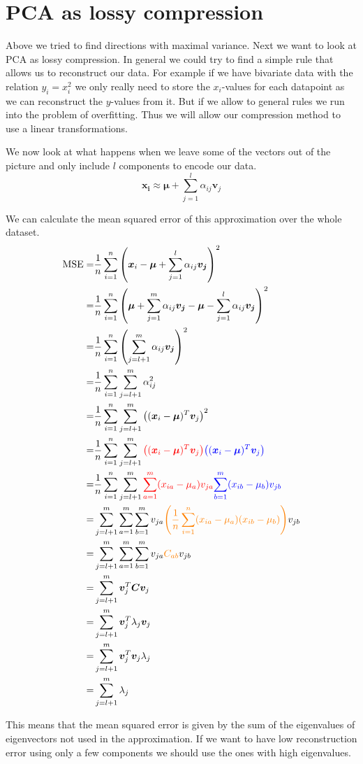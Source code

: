 \section{PCA as lossy compression}
Above we tried to find directions with maximal variance.
Next we want to look at PCA as lossy compression.
In general we could try to find a simple rule that allows us to reconstruct our data.
For example if we have bivariate data with the relation $y_i = x_i^2$ we only really need to store the $x_i$-values
for each datapoint as we can reconstruct the $y$-values from it.
But if we allow to general rules we run into the problem of overfitting.
Thus we will allow our compression method to use a linear transformations.

We now look at what happens when we 
leave some of the vectors out of the picture and only include $l$ components to encode our data.
\begin{equation}
    \bm{x_i} \approx \bm{\mu} + \sum_{j=1}^l \alpha_{ij} \bm{v}_j
\end{equation}

We can calculate the mean squared error of this approximation over the whole dataset.
\begin{align}
    \text{MSE} =& \frac{1}{n} \sum_{i=1}^n \left(\bm{x}_i - \bm{\mu} + \sum_{j=1}^l \alpha_{ij} \bm{v_j}\right)^2 \\
    =& \frac{1}{n} \sum_{i=1}^n \left(\bm{\mu} + \sum_{j=1}^m \alpha_{ij} \bm{v_j} - \bm{\mu} - \sum_{j=1}^l \alpha_{ij} \bm{v_j}\right)^2 \\
    =& \frac{1}{n} \sum_{i=1}^n \left(\sum_{j=l+1}^m \alpha_{ij} \bm{v_j} \right)^2 \\
    =& \frac{1}{n} \sum_{i=1}^n \sum_{j=l+1}^m \alpha_{ij} ^2 \\
    =& \frac{1}{n} \sum_{i=1}^n \sum_{j=l+1}^{m} \left( (\bm{x}_i - \bm{\mu})^T \bm{v}_j \right)^2 \\
    =& \frac{1}{n} \sum_{i=1}^n \sum_{j=l+1}^{m} {\color{red} \left( (\bm{x}_i - \bm{\mu})^T \bm{v}_j \right)} {\color{blue} \left( (\bm{x}_i - \bm{\mu})^T \bm{v}_j \right)} \\
    =& \frac{1}{n} \sum_{i=1}^n \sum_{j=l+1}^{m} {\color{red} \sum_{a=1}^m (x_{ia} - \mu_a) v_{ja}} {\color{blue} \sum_{b=1}^m (x_{ib} - \mu_b) v_{jb}}\\
    =& \sum_{j=l+1}^{m} \sum_{a=1}^m \sum_{b=1}^m v_{ja} {\color{orange} \left(\frac{1}{n} \sum_{i=1}^n (x_{ia} - \mu_a) (x_{ib} - \mu_b) \right)} v_{jb}\\
    =& \sum_{j=l+1}^{m} \sum_{a=1}^m \sum_{b=1}^m v_{ja} {\color{orange} C_{ab}} v_{jb}\\
    =& \sum_{j=l+1}^{m} \bm{v}_j^T \bm{C} \bm{v}_j\\
    =& \sum_{j=l+1}^{m} \bm{v}_j^T \lambda_j \bm{v}_j\\
    =& \sum_{j=l+1}^{m} \bm{v}_j^T \bm{v}_j \lambda_j \\
    =& \sum_{j=l+1}^{m} \lambda_j \\
\end{align}

This means that the mean squared error is given by the sum of the eigenvalues of eigenvectors not used in the approximation.
If we want to have low reconstruction error using only a few components we should use the ones with high eigenvalues.










